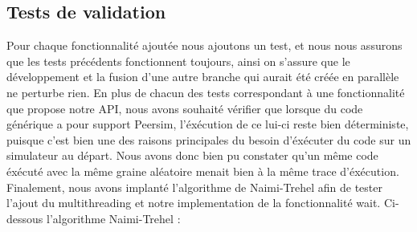\documentclass{article}
\begin{document}
			\subsection{Tests de validation}
			Pour chaque fonctionnalité ajoutée nous ajoutons un test, et nous nous assurons que les tests précédents fonctionnent toujours, ainsi on s'assure que le développement et la fusion d'une autre branche qui aurait été créée en parallèle ne perturbe rien.
			\newline
			\newline
			En plus de chacun des tests correspondant à une fonctionnalité que propose notre API, nous avons souhaité vérifier que lorsque du code générique a pour support Peersim, l'éxécution de ce lui-ci reste bien déterministe, puisque c'est bien une des raisons principales du besoin d'éxécuter du code sur un simulateur au départ. Nous avons donc bien pu constater qu'un même code éxécuté avec la même graine aléatoire menait bien à la même trace d'éxécution.\newline 
			Finalement, nous avons implanté l'algorithme de Naimi-Trehel afin de tester l'ajout du multithreading et notre implementation de la fonctionnalité wait.
			\newline
			Ci-dessous l'algorithme Naimi-Trehel :
\end{document}
